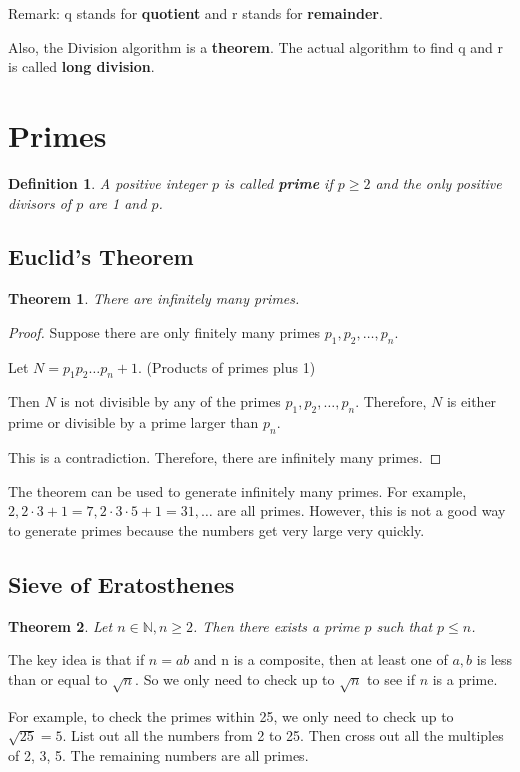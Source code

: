 \documentclass[letterpaper,12pt,oneside]{article}
\newtheorem{theorem}{Theorem}
\newtheorem{definition}{Definition}
\begin{document}
Remark: q stands for \textbf{quotient} and r stands for \textbf{remainder}.

Also, the Division algorithm is a \textbf{theorem}. The actual algorithm to
find q and r is called \textbf{long division}.
\section{Primes}
\begin{definition}
    A positive integer $p$ is called \textbf{prime} if $p \ge 2$ and the only positive divisors of $p$ are 1 and $p$.
\end{definition}
\subsection{Euclid's Theorem}
\begin{theorem}
    There are infinitely many primes.
\end{theorem}
\begin{proof}
    Suppose there are only finitely many primes $p_1, p_2, \dots, p_n$.

    Let $N = p_1p_2\dots p_n + 1$. (Products of primes plus 1)

    Then $N$ is not divisible by any of the primes $p_1, p_2, \dots, p_n$.
    Therefore, $N$ is either prime or divisible by a prime larger than $p_n$.

    This is a contradiction. Therefore, there are infinitely many primes.
\end{proof}
The theorem can be used to generate infinitely many primes. For example, $2, 2\cdot 3 + 1 = 7, 2\cdot 3\cdot 5 + 1 = 31, \dots$ are all primes. However, this is not a good way to generate primes because the numbers get very large very quickly.

\subsection{Sieve of Eratosthenes}
\begin{theorem}
    Let $n \in \mathbb{N}, n \ge 2$. Then there exists a prime $p$ such that $p \leq n$.
\end{theorem}
The key idea is that if $n=ab$ and n is a composite, then at least one of $a, b$ is less than or equal to $\sqrt{n}$. So we only need to check up to $\sqrt{n}$ to see if $n$ is a prime.

For example, to check the primes within 25, we only need to check up to
$\sqrt{25} = 5$. List out all the numbers from 2 to 25. Then cross out all the
multiples of 2, 3, 5. The remaining numbers are all primes.
\end{document}
